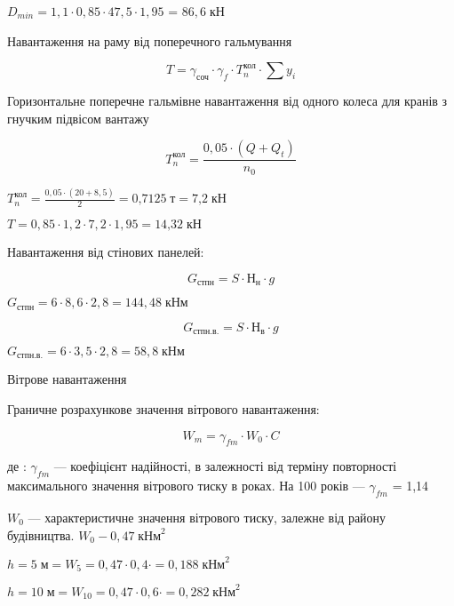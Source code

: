 \documentclass[a4paper,14pt]{article}
\begin{document}
$D_{min}=1,1\cdot 0,85 \cdot 47,5 \cdot 1,95$ = $86,6\;\textit{кН}$

Навантаження на раму від поперечного гальмування

\begin{equation}
    T=\gamma_\textit{соч}\cdot \gamma_f \cdot T^\textit{кол}_{n} \cdot \sum y_i
\end{equation}

Горизонтальне поперечне гальмівне навантаження від одного колеса 
   для кранів з гнучким підвісом вантажу 

\begin{equation}
    T^\textit{кол}_{n}=\frac {0,05\cdot (Q+Q_t)}{n_0}
\end{equation}

$T^\textit{кол}_{n}=\frac {0,05\cdot (20+8,5)}{2}=\textit{0,7125}\;\textit{т}=\textit{7,2}\;\textit{кН}$

$T=0,85\cdot 1,2 \cdot 7,2 \cdot 1,95 = \textit{14,32}\;\textit{кН}$

Навантаження від стінових панелей:

\begin{equation}
    G_\textit{стпн}= S \cdot Н_\textit{н}\cdot g
\end{equation}

$G_\textit{стпн}= 6 \cdot 8,6\cdot 2,8 = 144,48\;\textit{кНм}$

\begin{equation}
    G_\textit{стпн.в.}= S \cdot Н_\textit{в}\cdot g
\end{equation}

$G_\textit{стпн.в.}= 6 \cdot 3,5\cdot 2,8= 58,8\;\textit{кНм}$

Вітрове навантаження

Граничне розрахункове значення вітрового навантаження:

\begin{equation}
    W_\textit{m}= \gamma_{fm} \cdot W_\textit{0}\cdot C
\end{equation}

де :  $\gamma_{fm}$ ---  коефіцієнт надійності, в залежності від терміну повторності максимального значення вітрового тиску в роках. На 100 років --- $\gamma_{fm}$ = 1,14

$W_\textit{0}$ --- характеристичне значення вітрового тиску, залежне від району будівництва. $W_\textit{0} - 0,47\;\textit{кНм}^2$

$h=5\;\textit{м} = W_{5}= 0,47\cdot 0,4 \cdot = 0,188\;\textit{кНм}^2$

$h=10\;\textit{м} = W_{10}= 0,47\cdot 0,6 \cdot = 0,282\;\textit{кНм}^2$
\end{document}
